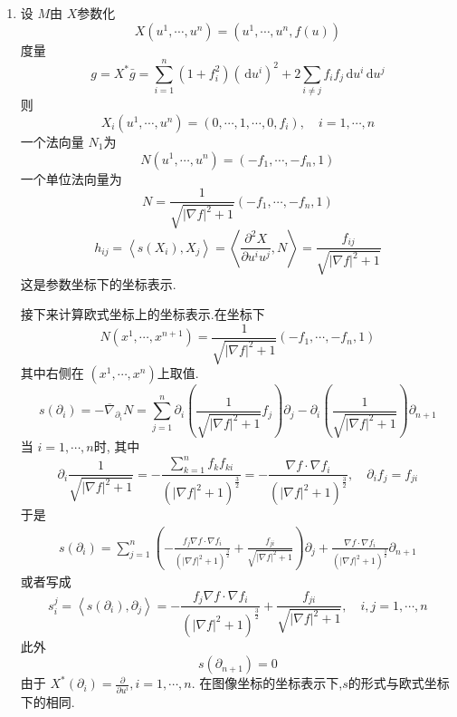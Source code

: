 \documentclass[../../几何与拓扑.tex]{subfiles}
\begin{document}
\begin{solution}
    \begin{enumerate}
        \item 设 \(  M  \)由 \(  X  \)参数化 \[
        X\left(  u^1,\cdots,u^n \right)=\left(  u^1,\cdots,u^n ,f\left( u \right)  \right)   
        \]度量 \[
        g =  X^{*} \bar{g}=  \sum _{i= 1}^{n} \left( 1+ f_{i}^{2} \right) \left( \,\mathrm{d} u^{i} \right)^{2} + 2 \sum _{i\neq j} f_{i}f_{j} \,\mathrm{d} u^{i}\,\mathrm{d} u^{j} 
        \]则 \[
        X_{i}\left(  u^1,\cdots,u^n  \right)= \left( 0,\cdots ,1,\cdots ,0, f_{i} \right)  ,\quad i=  1,\cdots,n 
        \]一个法向量 \(  N_1   \)为 \[
        N\left( u^{1},\cdots ,u^{n} \right)= \left(- f_1,\cdots ,-f_{n},1 \right)  
        \] 一个单位法向量为 \[
        N =  \frac{1 }{\sqrt{\left|  \nabla f \right|^{2}+ 1 } }\left( -f_1,\cdots ,-f_{n},1 \right)  
        \] \[
        h_{ij}=  \left<s\left( X_{i} \right),X_{j}  \right>= \left<\frac{\partial ^{2}X}{\partial u^{i}u^{j}},N \right>= \frac{f_{ij} }{\sqrt{\left|  \nabla f \right|^{2}+ 1 } } 
        \] 这是参数坐标下的坐标表示.
        
        
        接下来计算欧式坐标上的坐标表示.在坐标下 \[
        N\left( x^{1},\cdots ,x^{n+ 1} \right)= \frac{1 }{\sqrt{\left|  \nabla f \right|^{2}+ 1 } }  \left( -f_1,\cdots ,-f_{n},1 \right) 
        \]其中右侧在 \(  \left(  x^1,\cdots,x^n  \right)   \)上取值. \[
        s\left(  \partial _{i} \right)=- \overline{ \nabla } _{ \partial _{i}}N= \sum _{j= 1}^{n}  \partial _{i}\left( \frac{1 }{\sqrt{\left|  \nabla f \right|^{2}+ 1}  }  f_{j}\right) \partial _{j}  -   \partial _{i} \left( \frac{1 }{\sqrt{\left|  \nabla f \right|^{2}+ 1 } }  \right) \partial _{n+ 1} 
        \] 当 \(  i=  1,\cdots,n   \)时, 其中 \[
         \partial _{i} \frac{1 }{\sqrt{\left|  \nabla f \right|^{2}+ 1 } }= - \frac{\sum _{k= 1}^{n}f_{k}f_{ki} }{\left( \left|  \nabla f \right|^{2}+ 1  \right)^{\frac{3}{2}}  } = -\frac{ \nabla f\cdot  \nabla f_{i} }{\left( \left|  \nabla f \right|^{2}+ 1  \right)^{\frac{3}{2}}  }    ,\quad   \partial _{i}f_{j}= f_{ji}
        \]于是 \[
      \begin{aligned}
      s\left(  \partial _{i} \right)= \sum _{j= 1}^{n} \left( - \frac{f_{j} \nabla f\cdot  \nabla f_{i} }{\left( \left|  \nabla f \right|^{2}+ 1  \right)^{\frac{3}{2}}  }+  \frac{f_{ji} }{ \sqrt{\left|  \nabla f \right|^{2}+ 1 } }   \right) \partial _{j}+  \frac{ \nabla f\cdot  \nabla f_{i} }{\left( \left|  \nabla f \right|^{2}+ 1  \right)^{\frac{3}{2}}  } \partial _{n+ 1}   
      \end{aligned}  
        \]或者写成 \[
       s_{i}^{j}= \left<s\left(  \partial _{i} \right), \partial _{j}  \right>= -\frac{f_{j} \nabla f\cdot  \nabla f_{i} }{\left( \left|  \nabla f \right|^{2}+ 1  \right)^{\frac{3}{2}}  } +  \frac{f_{ji} }{\sqrt{\left|  \nabla f \right|^{2}+ 1 } } ,\quad i,j=  1,\cdots,n  
        \]此外 \[
        s\left(  \partial _{n+ 1} \right)= 0 
        \]
        由于 \(  X^{*}\left(  \partial _{i} \right)= \frac{\partial }{\partial u^{i}}   ,i=  1,\cdots,n \). 在图像坐标的坐标表示下,\(  s  \)的形式与欧式坐标下的相同. 


\end{enumerate}
\end{solution}
\end{document}
